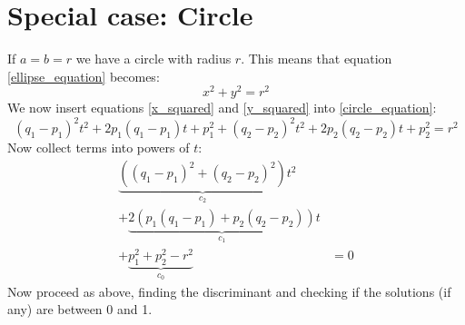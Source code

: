 \documentclass[12pt, a4paper]{article}
\numberwithin{equation}{section}
\begin{document}
\section{Special case: Circle}
If $a=b=r$ we have a circle with radius $r$. This means that equation \ref{ellipse_equation} becomes:
\begin{equation}
\label{circle_equation}
x^2+y^2=r^2
\end{equation}
We now insert equations \ref{x_squared} and \ref{y_squared} into \ref{circle_equation}:
\begin{equation}
(q_1-p_1)^2t^2+2p_1(q_1-p_1)t+p_1^2+(q_2-p_2)^2t^2+2p_2(q_2-p_2)t+p_2^2=r^2
\end{equation}
Now collect terms into powers of $t$:
\begin{align}
\underbrace{\left((q_1-p_1)^2+(q_2-p_2)^2\right)}_{c_2}t^2 &\\
+\underbrace{2\left(p_1(q_1-p_1)+p_2(q_2-p_2)\right)}_{c_1}t &\\
+\underbrace{p_1^2+p_2^2-r^2}_{c_0} & = 0
\end{align}
Now proceed as above, finding the discriminant and checking if the solutions (if any) are between 0 and 1.
\end{document}
